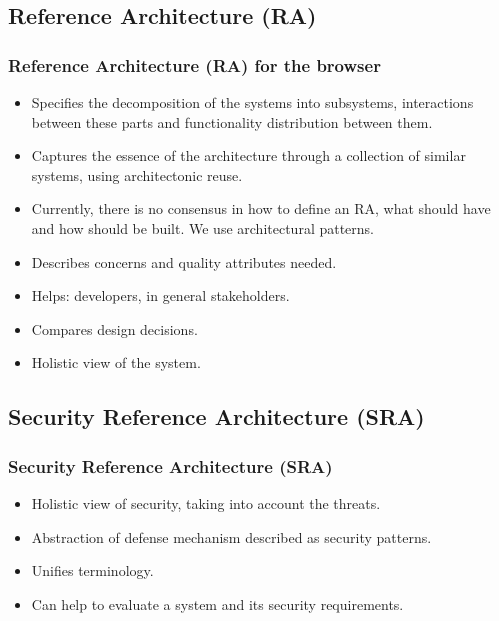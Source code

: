 \documentclass[serif,9pt]{beamer}
\begin{document}
\subsection{Reference Architecture (RA)}
\begin{frame}
	\frametitle{Reference Architecture (RA) for the browser}
		\begin{itemize}
			\item<1-> Specifies the decomposition of the systems into subsystems, interactions between these parts and functionality distribution between them.
			\item<1-> Captures the essence of the architecture through a collection of similar systems, using architectonic reuse.
			\item Currently, there is no consensus in how to define an RA, what should have and how should be built. We use architectural patterns.
			\item<2-> Describes concerns and quality attributes needed.
			\item<2-> Helps: developers, in general stakeholders.
			\item<3-> Compares design decisions.
			\item<3-> Holistic view of the system.
		\end{itemize}
\end{frame}

\subsection{Security Reference Architecture (SRA)}
\begin{frame}
	\frametitle{Security Reference Architecture (SRA)}
	\begin{itemize}
		\item<1-> Holistic view of security, taking into account the threats.
		\item<1-> Abstraction of defense mechanism described as security patterns.
		\item<2-> Unifies terminology.
		\item<2-> Can help to evaluate a system and its security requirements.
	\end{itemize}
\end{frame}
\end{document}
